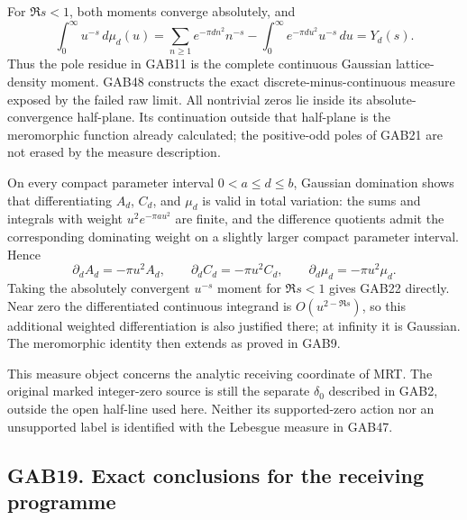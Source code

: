 \documentclass[
  10pt,
  a4paper,
]{article}
\begin{document}
For \(\Re s<1\), both moments converge absolutely, and \[
 \boxed{\displaystyle
 \int_0^\infty u^{-s}\,d\mu_d(u)
   =\sum_{n\ge1}e^{-\pi d n^2}n^{-s}
       -\int_0^\infty e^{-\pi d u^2}u^{-s}\,du
   =Y_d(s).}                                         \tag{GAB48}
\] Thus the pole residue in GAB11 is the complete continuous Gaussian
lattice-density moment. GAB48 constructs the exact
discrete-minus-continuous measure exposed by the failed raw limit. All
nontrivial zeros lie inside its absolute-convergence half-plane. Its
continuation outside that half-plane is the meromorphic function already
calculated; the positive-odd poles of GAB21 are not erased by the
measure description.

On every compact parameter interval \(0<a\le d\le b\), Gaussian
domination shows that differentiating \(A_d\), \(C_d\), and \(\mu_d\) is
valid in total variation: the sums and integrals with weight
\(u^2e^{-\pi a u^2}\) are finite, and the difference quotients admit the
corresponding dominating weight on a slightly larger compact parameter
interval. Hence \[
 \partial_d A_d=-\pi u^2A_d,\qquad
 \partial_d C_d=-\pi u^2C_d,\qquad
 \partial_d\mu_d=-\pi u^2\mu_d.                        \tag{GAB49}
\] Taking the absolutely convergent \(u^{-s}\) moment for \(\Re s<1\)
gives GAB22 directly. Near zero the differentiated continuous integrand
is \(O(u^{2-\Re s})\), so this additional weighted differentiation is
also justified there; at infinity it is Gaussian. The meromorphic
identity then extends as proved in GAB9.

This measure object concerns the analytic receiving coordinate of MRT.
The original marked integer-zero source is still the separate
\(\delta_0\) described in GAB2, outside the open half-line used here.
Neither its supported-zero action nor an unsupported label is identified
with the Lebesgue measure in GAB47.

\subsection{GAB19. Exact conclusions for the receiving
programme}\label{gab19.-exact-conclusions-for-the-receiving-programme}
\end{document}
